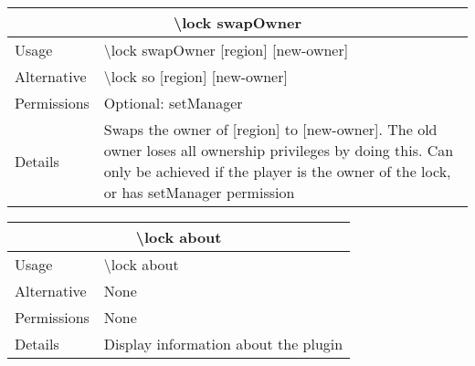 \documentclass[a4paper,twoside,notitlepage,11pt]{article}
\begin{document}
\begin{center}
\begin{tabular}{|p{2cm}|p{12.5cm}|} \hline
\multicolumn{2}{|c|}{\textbf{\textbackslash lock swapOwner}} \\ \hline
Usage       & \textbackslash lock swapOwner [region] [new-owner] \\ \hline
Alternative & \textbackslash lock so [region] [new-owner]\\ \hline
Permissions & Optional: setManager \\ \hline
Details 	& Swaps the owner of [region] to [new-owner]. The old owner loses all ownership privileges by doing this. Can only be achieved if the player is the owner of the lock, or has setManager permission \\ \hline
\end{tabular}
\end{center}

\begin{center}
\begin{tabular}{|p{2cm}|p{12.5cm}|} \hline
\multicolumn{2}{|c|}{\textbf{\textbackslash lock about}} \\ \hline
Usage       & \textbackslash lock about \\ \hline
Alternative & None \\ \hline
Permissions & None \\ \hline
Details 	& Display information about the plugin \\ \hline
\end{tabular}
\end{center}
\end{document}
